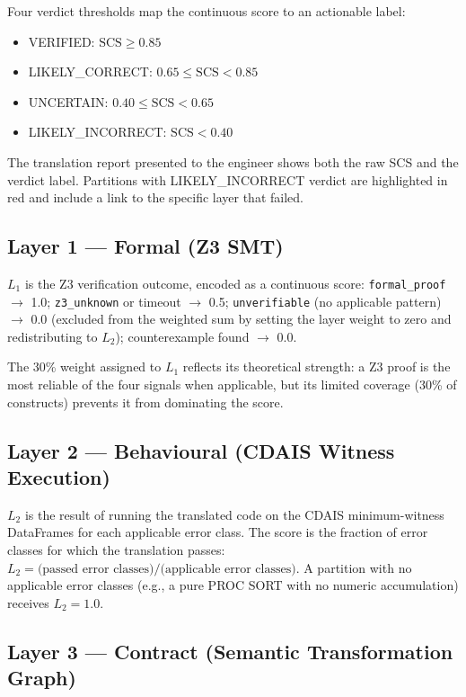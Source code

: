 Four verdict thresholds map the continuous score to an actionable label:
\begin{itemize}
  \item VERIFIED: $\mathrm{SCS} \geq 0.85$
  \item LIKELY\_CORRECT: $0.65 \leq \mathrm{SCS} < 0.85$
  \item UNCERTAIN: $0.40 \leq \mathrm{SCS} < 0.65$
  \item LIKELY\_INCORRECT: $\mathrm{SCS} < 0.40$
\end{itemize}

The translation report presented to the engineer shows both the raw SCS and
the verdict label. Partitions with LIKELY\_INCORRECT verdict are highlighted
in red and include a link to the specific layer that failed.

\subsection{Layer 1 --- Formal (Z3 SMT)}
\label{subsec:sc-l1}

$L_1$ is the Z3 verification outcome, encoded as a continuous score:
\texttt{formal\_proof} $\rightarrow$ 1.0;
\texttt{z3\_unknown} or timeout $\rightarrow$ 0.5;
\texttt{unverifiable} (no applicable pattern) $\rightarrow$ 0.0 (excluded
from the weighted sum by setting the layer weight to zero and redistributing
to $L_2$); counterexample found $\rightarrow$ 0.0.

The 30\% weight assigned to $L_1$ reflects its theoretical strength: a Z3 proof
is the most reliable of the four signals when applicable, but its limited
coverage (30\% of constructs) prevents it from dominating the score.

\subsection{Layer 2 --- Behavioural (CDAIS Witness Execution)}
\label{subsec:sc-l2}

$L_2$ is the result of running the translated code on the CDAIS minimum-witness
DataFrames for each applicable error class. The score is the fraction of error
classes for which the translation passes:
$L_2 = \text{(passed error classes)} / \text{(applicable error classes)}$.
A partition with no applicable error classes (e.g., a pure PROC SORT with no
numeric accumulation) receives $L_2 = 1.0$.

\subsection{Layer 3 --- Contract (Semantic Transformation Graph)}
\label{subsec:sc-l3}

